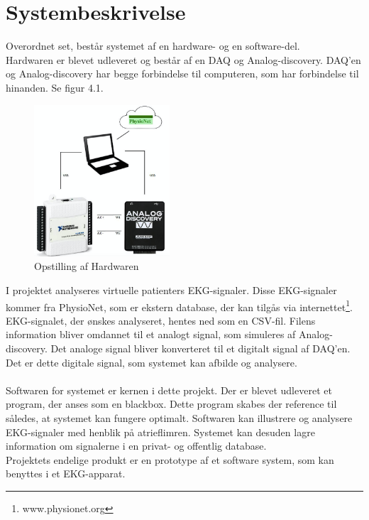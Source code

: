 \chapter{Systembeskrivelse}

Overordnet set, består systemet af en hardware- og en software-del.\\ Hardwaren er blevet udleveret og består af en DAQ og Analog-discovery. DAQ'en og Analog-discovery har begge forbindelse til computeren, som har forbindelse til hinanden. Se figur 4.1.  

\begin{figure}[H]
	\centering
	\includegraphics[width=0.45\textwidth]{Figurer/Snip20150427_1}
	\caption{Opstilling af Hardwaren}
\end{figure}

I projektet analyseres virtuelle patienters EKG-signaler. Disse EKG-signaler kommer fra PhysioNet, som er ekstern database, der kan tilgås via internettet\footnote{www.physionet.org}. EKG-signalet, der ønskes analyseret, hentes ned som en CSV-fil. Filens information bliver omdannet til et analogt signal, som simuleres af Analog-discovery. Det analoge signal bliver konverteret til et digitalt signal af DAQ'en. Det er dette digitale signal, som systemet kan afbilde og analysere.
\\ \\
Softwaren for systemet er kernen i dette projekt. Der er blevet udleveret et program, der anses som en blackbox. Dette program skabes der reference til således, at systemet kan fungere optimalt. Softwaren kan illustrere og analysere EKG-signaler med henblik på atrieflimren. Systemet kan desuden lagre information om signalerne i en privat- og offentlig database.\\
Projektets endelige produkt er en prototype af et software system, som kan benyttes i et EKG-apparat.            

